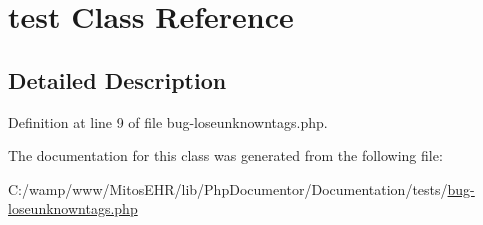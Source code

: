 \hypertarget{classtest}{\section{test \-Class \-Reference}
\label{classtest}
}


\subsection{\-Detailed \-Description}


\-Definition at line 9 of file bug-\/loseunknowntags.\-php.



\-The documentation for this class was generated from the following file\-:\begin{DoxyCompactItemize}
\item 
\-C\-:/wamp/www/\-Mitos\-E\-H\-R/lib/\-Php\-Documentor/\-Documentation/tests/\hyperlink{bug-loseunknowntags_8php}{bug-\/loseunknowntags.\-php}\end{DoxyCompactItemize}
